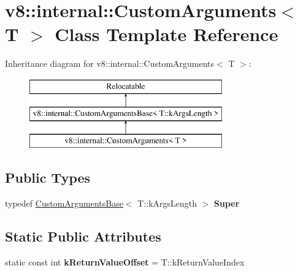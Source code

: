 \hypertarget{classv8_1_1internal_1_1_custom_arguments}{}\section{v8\+:\+:internal\+:\+:Custom\+Arguments$<$ T $>$ Class Template Reference}
\label{classv8_1_1internal_1_1_custom_arguments}
Inheritance diagram for v8\+:\+:internal\+:\+:Custom\+Arguments$<$ T $>$\+:\begin{figure}[H]
\begin{center}
\leavevmode
\includegraphics[height=3.000000cm]{classv8_1_1internal_1_1_custom_arguments}
\end{center}
\end{figure}
\subsection*{Public Types}
\begin{DoxyCompactItemize}
\item 
typedef \hyperlink{classv8_1_1internal_1_1_custom_arguments_base}{Custom\+Arguments\+Base}$<$ T\+::k\+Args\+Length $>$ {\bfseries Super}\hypertarget{classv8_1_1internal_1_1_custom_arguments_a7f75869df8dba5698105acfe6dd1b39c}{}\label{classv8_1_1internal_1_1_custom_arguments_a7f75869df8dba5698105acfe6dd1b39c}

\end{DoxyCompactItemize}
\subsection*{Static Public Attributes}
\begin{DoxyCompactItemize}
\item 
static const int {\bfseries k\+Return\+Value\+Offset} = T\+::k\+Return\+Value\+Index\hypertarget{classv8_1_1internal_1_1_custom_arguments_a4665e0b15cda8ed07911cbb4a000f5cc}{}\label{classv8_1_1internal_1_1_custom_arguments_a4665e0b15cda8ed07911cbb4a000f5cc}

\end{DoxyCompactItemize}
